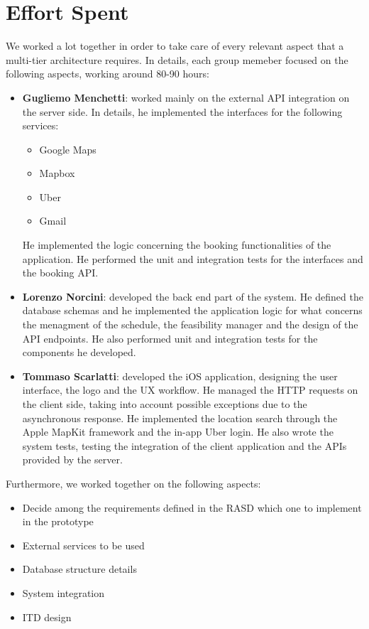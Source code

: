 \section{Effort Spent}

We worked a lot together in order to take care of every relevant aspect that a multi-tier architecture requires. In details, each group memeber focused on the following aspects, working around 80-90 hours:

\begin{itemize}
	\item \textbf{Gugliemo Menchetti}: worked mainly on the external API integration on the server side. In details, he implemented the interfaces for the following services:
	\begin{itemize}
		\item Google Maps
		\item Mapbox
		\item Uber
		\item Gmail
	\end{itemize}
	He implemented the logic concerning the booking functionalities of the application. He performed the unit and integration tests for the interfaces and the booking API.
	
	\item \textbf{Lorenzo Norcini}: developed the back end part of the system. He defined the database schemas and he implemented the application logic for what concerns the menagment of the schedule, the feasibility manager and the design of the API endpoints. He also performed unit and integration tests for the components he developed. 
	
	\item \textbf{Tommaso Scarlatti}: developed the iOS application, designing the user interface, the logo and the UX workflow. He managed the HTTP requests on the client side, taking into account possible exceptions due to the asynchronous response. He implemented the location search through the Apple MapKit framework and the in-app Uber login. He also wrote the system tests, testing the integration of the client application and the APIs provided by the server.

\end{itemize}

Furthermore, we worked together on the following aspects:

\begin{itemize}
	\item Decide among the requirements defined in the RASD which one to implement in the prototype
	\item External services to be used
	\item Database structure details
	\item System integration
	\item ITD design
\end{itemize}